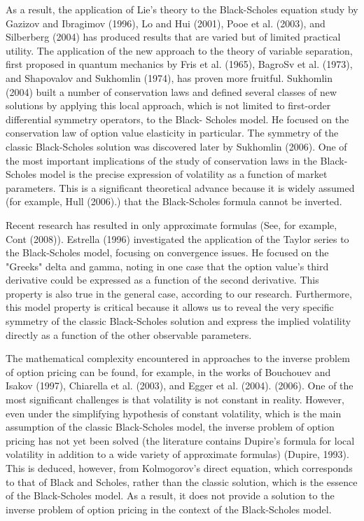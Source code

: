 \documentclass[a4 paper, 12pt]{report}
\theoremstyle{plain}
\begin{document}
\par As a result, the application of Lie's theory to the Black-Scholes equation study by Gazizov and Ibragimov (1996), Lo and Hui (2001), Pooe et al. (2003), and Silberberg (2004) has produced results that are varied but of limited practical utility. The application of the new approach to the theory of variable separation, first proposed in quantum mechanics by Fris et al. (1965), BagroSv et al. (1973), and Shapovalov and Sukhomlin (1974), has proven more fruitful. Sukhomlin (2004) built a number of conservation laws and defined several classes of new solutions by applying this local approach, which is not limited to first-order differential symmetry operators, to the Black- Scholes model.
He focused on the conservation law of option value elasticity in particular. The symmetry of the classic Black-Scholes solution was discovered later by Sukhomlin (2006). One of the most important implications of the study of conservation laws in the Black-Scholes model is the precise expression of volatility as a function of market parameters. This is a significant theoretical advance because it is widely assumed (for example, Hull (2006).) that the Black-Scholes formula cannot be inverted.\\

\par Recent research has resulted in only approximate formulas (See, for example, Cont (2008)). Estrella (1996) investigated the application of the Taylor series to the Black-Scholes model, focusing on convergence issues. He focused on the "Greeks" delta and gamma, noting in one case that the option value's third derivative could be expressed as a function of the second derivative. This property is also true in the general case, according to our research. Furthermore, this model property is critical because it allows us to reveal the very specific symmetry of the classic Black-Scholes solution and express the implied volatility directly as a function of the other observable parameters.\\

\par The mathematical complexity encountered in approaches to the inverse problem of option pricing can be found, for example, in the works of Bouchouev and Isakov (1997), Chiarella et al. (2003), and Egger et al. (2004). (2006). One of the most significant challenges is that volatility is not constant in reality. However, even under the simplifying hypothesis of constant volatility, which is the main assumption of the classic Black-Scholes model, the inverse problem of option pricing has not yet been solved (the literature contains Dupire's formula for local volatility in addition to a wide variety of approximate formulas) (Dupire, 1993). This is deduced, however, from Kolmogorov's direct equation, which corresponds to that of Black and Scholes, rather than the classic solution, which is the essence of the Black-Scholes model. As a result, it does not provide a solution to the inverse problem of option pricing in the context of the Black-Scholes model.\\
\end{document}
